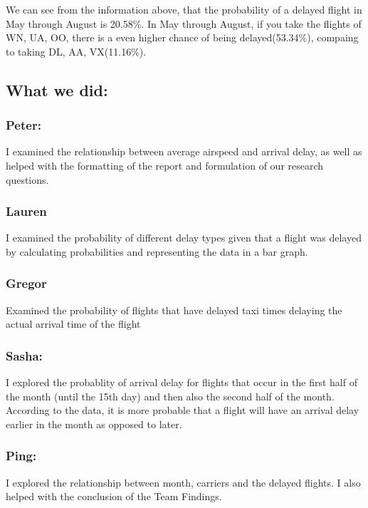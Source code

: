 \documentclass[]{article}
\begin{document}
We can see from the information above, that the probability of a delayed
flight in May through August is 20.58\%. In May through August, if you
take the flights of WN, UA, OO, there is a even higher chance of being
delayed(53.34\%), compaing to taking DL, AA, VX(11.16\%).

\subsection{What we did:}\label{what-we-did}

\subsubsection{Peter:}\label{peter-2}

I examined the relationship between average airspeed and arrival delay,
as well as helped with the formatting of the report and formulation of
our research questions.

\subsubsection{Lauren}\label{lauren-2}

I examined the probability of different delay types given that a flight
was delayed by calculating probabilities and representing the data in a
bar graph.

\subsubsection{Gregor}\label{gregor-1}

Examined the probability of flights that have delayed taxi times
delaying the actual arrival time of the flight

\subsubsection{Sasha:}\label{sasha-1}

I explored the probablity of arrival delay for flights that occur in the
first half of the month (until the 15th day) and then also the second
half of the month. According to the data, it is more probable that a
flight will have an arrival delay earlier in the month as opposed to
later.

\subsubsection{Ping:}\label{ping-3}

I explored the relationship between month, carriers and the delayed
flights. I also helped with the conclusion of the Team Findings.
\end{document}
